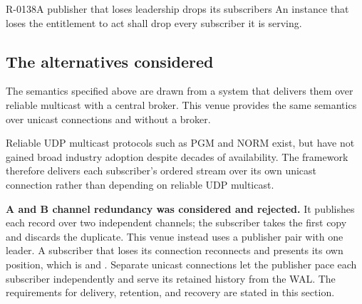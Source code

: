 \begin{requirement}{R-0138}{A publisher that loses leadership drops its subscribers}
  An instance that loses the entitlement to act shall drop every subscriber it
  is serving.
\end{requirement}

\subsection{The alternatives considered}
\label{sec:pubsub_alternatives}

The semantics specified above are drawn from a system that delivers them over
reliable multicast with a central broker. This venue provides the same semantics
over unicast connections and without a broker.

Reliable UDP multicast protocols such as PGM and NORM exist, but have not
gained broad industry adoption despite decades of availability. The framework
therefore delivers each subscriber's ordered stream over its own unicast
connection rather than depending on reliable UDP multicast.

\textbf{A and B channel redundancy was considered and rejected.} It publishes
each record over two independent channels; the subscriber takes the first copy
and discards the duplicate. This venue instead uses a publisher pair with one
leader. A subscriber that loses its connection reconnects and presents its own
position, which is  and . Separate unicast
connections let the publisher pace each subscriber independently and serve its
retained history from the WAL. The requirements for delivery, retention, and
recovery are stated in this section.
